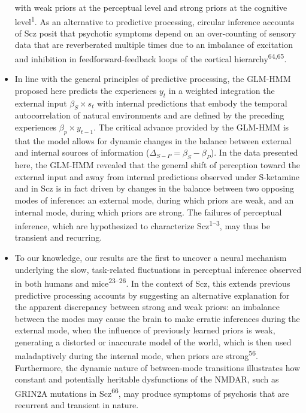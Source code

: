 \documentclass[
]{article}
\begin{document}
\begin{itemize}
  with weak priors at the perceptual level and strong priors at the
  cognitive level\textsuperscript{1}. As an alternative to predictive
  processing, circular inference accounts of Scz posit that psychotic
  symptoms depend on an over-counting of sensory data that are
  reverberated multiple times due to an imbalance of excitation and
  inhibition in feedforward-feedback loops of the cortical
  hierarchy\textsuperscript{64,65}.
\item
  In line with the general principles of predictive processing, the
  GLM-HMM proposed here predicts the experiences \(y_t\) in a weighted
  integration the external input \(\beta_S \times s_t\) with internal
  predictions that embody the temporal autocorrelation of natural
  environments and are defined by the preceding experiences
  \(\beta_p \times y_{t-1}\). The critical advance provided by the
  GLM-HMM is that the model allows for dynamic changes in the balance
  between external and internal sources of information
  (\(\Delta_{S-P} = \beta_S - \beta_P\)). In the data presented here,
  the GLM-HMM revealed that the general shift of perception toward the
  external input and away from internal predictions observed under
  S-ketamine and in Scz is in fact driven by changes in the balance
  between two opposing modes of inference: an external mode, during
  which priors are weak, and an internal mode, during which priors are
  strong. The failures of perceptual inference, which are hypothesized
  to characterize Scz\textsuperscript{1--3}, may thus be transient and
  recurring.
\item
  To our knowledge, our results are the first to uncover a neural
  mechanism underlying the slow, task-related fluctuations in perceptual
  inference observed in both humans and mice\textsuperscript{23--26}. In
  the context of Scz, this extends previous predictive processing
  accounts by suggesting an alternative explanation for the apparent
  discrepancy between strong and weak priors: an imbalance between the
  modes may cause the brain to make erratic inferences during the
  external mode, when the influence of previously learned priors is
  weak, generating a distorted or inaccurate model of the world, which
  is then used maladaptively during the internal mode, when priors are
  strong\textsuperscript{56}. Furthermore, the dynamic nature of
  between-mode transitions illustrates how constant and potentially
  heritable dysfunctions of the NMDAR, such as GRIN2A mutations in
  Scz\textsuperscript{66}, may produce symptoms of psychosis that are
  recurrent and transient in nature.
\end{itemize}
\end{document}

